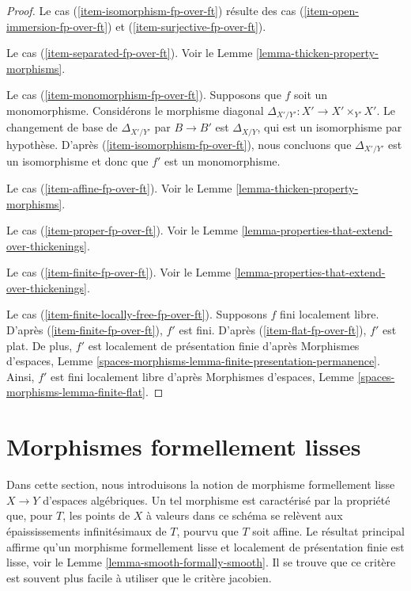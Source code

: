 \begin{proof}
\medskip\noindent
Le cas (\ref{item-isomorphism-fp-over-ft}) résulte des cas
(\ref{item-open-immersion-fp-over-ft}) et (\ref{item-surjective-fp-over-ft}).

\medskip\noindent
Le cas (\ref{item-separated-fp-over-ft}). Voir le
Lemme \ref{lemma-thicken-property-morphisms}.

\medskip\noindent
Le cas (\ref{item-monomorphism-fp-over-ft}). Supposons que $f$ soit un monomorphisme.
Considérons le morphisme diagonal $\Delta_{X'/Y'} : X' \to X' \times_{Y'} X'$.
Le changement de base de $\Delta_{X'/Y'}$ par $B \to B'$ est $\Delta_{X/Y}$,
qui est un isomorphisme par hypothèse. D'après (\ref{item-isomorphism-fp-over-ft}),
nous concluons que $\Delta_{X'/Y'}$ est un isomorphisme et donc que
$f'$ est un monomorphisme.

\medskip\noindent
Le cas (\ref{item-affine-fp-over-ft}).
Voir le Lemme \ref{lemma-thicken-property-morphisms}.

\medskip\noindent
Le cas (\ref{item-proper-fp-over-ft}). Voir le
Lemme \ref{lemma-properties-that-extend-over-thickenings}.

\medskip\noindent
Le cas (\ref{item-finite-fp-over-ft}). Voir le
Lemme \ref{lemma-properties-that-extend-over-thickenings}.

\medskip\noindent
Le cas (\ref{item-finite-locally-free-fp-over-ft}).
Supposons $f$ fini localement libre.
D'après (\ref{item-finite-fp-over-ft}), $f'$ est fini.
D'après (\ref{item-flat-fp-over-ft}), $f'$ est plat.
De plus, $f'$ est localement de présentation finie d'après
Morphismes d'espaces, Lemme
\ref{spaces-morphisms-lemma-finite-presentation-permanence}.
Ainsi, $f'$ est fini localement libre d'après
Morphismes d'espaces, Lemme \ref{spaces-morphisms-lemma-finite-flat}.
\end{proof}













\section{Morphismes formellement lisses}
\label{section-formally-smooth}

\noindent
Dans cette section, nous introduisons la notion de morphisme formellement lisse
$X \to Y$ d'espaces algébriques. Un tel morphisme est
caractérisé par la propriété que, pour $T$, les points de $X$ à valeurs dans ce schéma se relèvent
aux épaississements infinitésimaux de $T$, pourvu que $T$ soit affine.
Le résultat principal affirme qu'un morphisme formellement lisse et
localement de présentation finie est lisse, voir le
Lemme \ref{lemma-smooth-formally-smooth}.
Il se trouve que ce critère est souvent plus facile à utiliser que le
critère jacobien.

